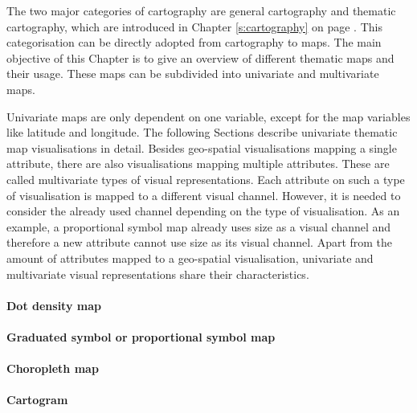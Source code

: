 The two major categories of cartography are general cartography and thematic cartography, which are introduced in Chapter \ref{s:cartography} on page \pageref{s:cartography}. This categorisation can be directly adopted from cartography to maps. The main objective of this Chapter is to give an overview of different thematic maps and their usage. These maps can be subdivided into univariate and multivariate maps.

\cbstart
Univariate maps are only dependent on one variable, except for the map variables like latitude and longitude. The following Sections describe univariate thematic map visualisations in detail. Besides geo-spatial visualisations mapping a single attribute, there are also visualisations mapping multiple attributes. These are called multivariate types of visual representations. Each attribute on such a type of visualisation is mapped to a different visual channel. However, it is needed to consider the already used channel depending on the type of visualisation. As an example, a proportional symbol map already uses size as a visual channel and therefore a new attribute cannot use size as its visual channel.
Apart from the amount of attributes mapped to a geo-spatial visualisation, univariate and multivariate visual representations share their characteristics.
\cbend

\paragraph{Dot density map}
\label{s:dot}


\paragraph{Graduated symbol or proportional symbol map}


\paragraph{Choropleth map}

\label{s:choropleth}

\paragraph{Cartogram}

